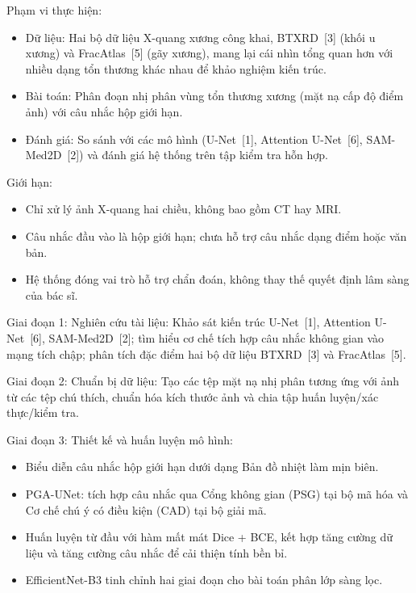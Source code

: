 \medskip
{}

\medskip
Phạm vi thực hiện:
\begin{itemize}
    \item Dữ liệu: Hai bộ dữ liệu X-quang xương công khai, BTXRD~[3] (khối u xương) và FracAtlas~[5] (gãy xương), mang lại cái nhìn tổng quan hơn với nhiều dạng tổn thương khác nhau để khảo nghiệm kiến trúc.
    \item Bài toán: Phân đoạn nhị phân vùng tổn thương xương (mặt nạ cấp độ điểm ảnh) với câu nhắc hộp giới hạn.
    \item Đánh giá: So sánh với các mô hình (U-Net~[1], Attention U-Net~[6], SAM-Med2D~[2]) và đánh giá hệ thống trên tập kiểm tra hỗn hợp.
\end{itemize}

Giới hạn:
\begin{itemize}
    \item Chỉ xử lý ảnh X-quang hai chiều, không bao gồm CT hay MRI.
    \item Câu nhắc đầu vào là hộp giới hạn; chưa hỗ trợ câu nhắc dạng điểm hoặc văn bản.
    \item Hệ thống đóng vai trò hỗ trợ chẩn đoán, không thay thế quyết định lâm sàng của bác sĩ.
\end{itemize}

\medskip
{}

\medskip
Giai đoạn 1: Nghiên cứu tài liệu: Khảo sát kiến trúc U-Net~[1], Attention U-Net~[6], SAM-Med2D~[2]; tìm hiểu cơ chế tích hợp câu nhắc không gian vào mạng tích chập; phân tích đặc điểm hai bộ dữ liệu BTXRD~[3] và FracAtlas~[5].

Giai đoạn 2: Chuẩn bị dữ liệu: Tạo các tệp mặt nạ nhị phân tương ứng với ảnh từ các tệp chú thích, chuẩn hóa kích thước ảnh và chia tập huấn luyện/xác thực/kiểm tra.

Giai đoạn 3: Thiết kế và huấn luyện mô hình:
\begin{itemize}
    \item Biểu diễn câu nhắc hộp giới hạn dưới dạng Bản đồ nhiệt làm mịn biên.
    \item PGA-UNet: tích hợp câu nhắc qua Cổng không gian (PSG) tại bộ mã hóa và Cơ chế chú ý có điều kiện (CAD) tại bộ giải mã.
    \item Huấn luyện từ đầu với hàm mất mát Dice + BCE, kết hợp tăng cường dữ liệu và tăng cường câu nhắc để cải thiện tính bền bỉ.
    \item EfficientNet-B3 tinh chỉnh hai giai đoạn cho bài toán phân lớp sàng lọc.
\end{itemize}

